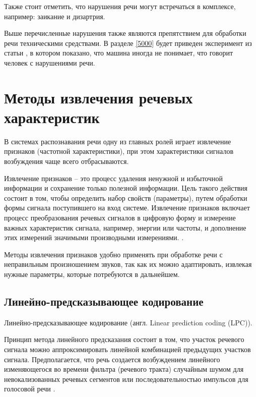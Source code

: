 Также стоит отметить, что нарушения речи могут встречаться в комплексе, например: заикание и дизартрия.

Выше перечисленные нарушения также являются препятствием для обработки речи техническими средствами. В разделе \ref{5000} будет приведен эксперимент из статьи \cite{primer}, в котором показано, что машина иногда не понимает, что говорит человек с нарушениями речи.



\section{Методы извлечения речевых характеристик}
В системах распознавания речи одну из главных ролей играет извлечение признаков (частотной характеристики), при этом характеристики сигналов возбуждения чаще всего отбрасываются. 

Извлечение признаков -- это процесс удаления ненужной и избыточной информации и сохранение только полезной информации. Цель такого действия состоит в том, чтобы определить набор свойств (параметры), путем обработки формы сигнала поступившего на вход системе.  Извлечение признаков включает процесс преобразования речевых сигналов в цифровую форму и измерение важных характеристик сигнала, например, энергии или частоты, и дополнение этих измерений значимыми производными измерениями. \cite{isvparam1} \cite{isvparam2}.

Методы извлечения признаков удобно применять при обработке речи с неправильным произношением звуков, так как их можно адаптировать, извлекая нужные параметры, которые потребуются в дальнейшем.

\subsection{Линейно-предсказывающее кодирование}
Линейно-предсказывающее кодирование (англ. Linear prediction coding (LPC)).


Принцип метода линейного предсказания состоит в том, что участок речевого сигнала можно аппроксимировать линейной комбинацией предыдущих участков сигнала. Предполагается, что речь создается возбуждением линейного изменяющегося во времени фильтра (речевого тракта) случайным шумом для невокализованных речевых сегментов или последовательностью импульсов для голосовой речи \cite{methodisb}.


